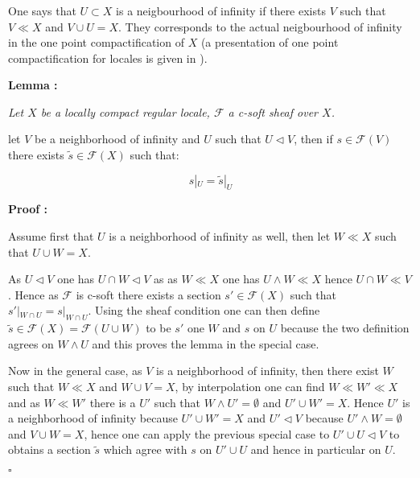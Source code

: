 \documentclass[a4paper]{article}
\newcommand{\Fcal}{\mathcal{F}}
\newcommand{\block}[1]
{

\par \subsubsection{} #1

\bigskip}
\newcommand{\Lem}[1]
	{

	\bigskip
	
	\textbf{Lemma : }{\itshape #1}
		
	\bigskip
	
	}
\newcommand{\Dem}[1]{
	
	\smallskip
	
	\textbf{Proof : } \par
	 {#1} $\square$
	 
	 \bigskip
}
\begin{document}
\block{\label{LemmeSoftExtensionInf}One says that $U \subset X$ is a neigbourhood of infinity if there exists $V$ such that $V \ll X$ and $V \cup U =X$. They corresponds to the actual neigbourhood of infinity in the one point compactification of $X$ (a presentation of one point compactification for locales is given in \cite{henry2014nonunital}).

\Lem{Let $X$ be a locally compact regular locale, $\Fcal$ a c-soft sheaf over $X$.

 let $V$ be a neighborhood of infinity and $U$ such that $U \triangleleft V$, then if $s \in \Fcal(V)$ there exists $\widetilde{s} \in \Fcal(X)$ such that:

\[ s|_U = \widetilde{s}|_U \]

}

\Dem{Assume first that $U$ is a neighborhood of infinity as well, then let $W \ll X$ such that $U \cup W =X$.

As $U \triangleleft V$ one has $U \cap W \triangleleft V$ as as $W \ll X$ one has $U \wedge W \ll X$ hence $U \cap W \ll V$. Hence as $\Fcal$ is c-soft there exists a section $s' \in \Fcal(X)$ such that $s'|_{W \cap U} = s|_{W \cap U}$. Using the sheaf condition one can then define $\widetilde{s} \in \Fcal(X)=\Fcal(U \cup W)$ to be $s'$ one $W$ and $s$ on $U$ because the two definition agrees on $W \wedge U$ and this proves the lemma in the special case.

Now in the general case, as $V$ is a neighborhood of infinity, then there exist $W$ such that $W \ll X$ and $W \cup V =X$, by interpolation one can find $W \ll W' \ll X$ and as $W \ll W'$ there is a $U'$ such that $W \wedge U' = \emptyset$ and $U' \cup W' = X$. Hence $U'$ is a neighborhood of infinity because $U' \cup W' =X$ and $U' \triangleleft V$ because $U' \wedge W = \emptyset$ and $V \cup W = X$, hence one can apply the previous special case to $U' \cup U \triangleleft V$ to obtains a section $\widetilde{s}$ which agree with $s$ on $U' \cup U$ and hence in particular on $U$.
}
}
\end{document}
